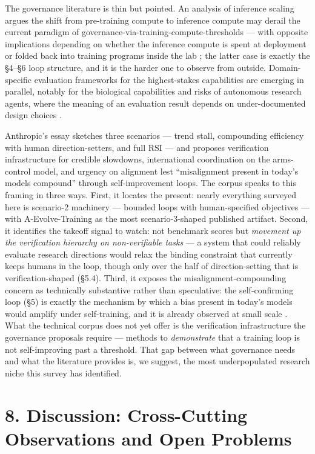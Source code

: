 \documentclass[
  11pt,
]{article}
\begin{document}
The governance literature is thin but pointed. An analysis of inference
scaling argues the shift from pre-training compute to inference compute
may derail the current paradigm of
governance-via-training-compute-thresholds --- with opposite
implications depending on whether the inference compute is spent at
deployment or folded back into training programs inside the lab
\citep{ord2025inference}; the latter case is exactly the §4--§6 loop
structure, and it is the harder one to observe from outside.
Domain-specific evaluation frameworks for the highest-stakes
capabilities are emerging in parallel, notably for the biological
capabilities and risks of autonomous research agents, where the meaning
of an evaluation result depends on under-documented design choices
\citep{paskov2026measuring}.

Anthropic's essay \citep{anthropic2026rsi} sketches three scenarios ---
trend stall, compounding efficiency with human direction-setters, and
full RSI --- and proposes verification infrastructure for credible
slowdowns, international coordination on the arms-control model, and
urgency on alignment lest ``misalignment present in today's models
compound'' through self-improvement loops. The corpus speaks to this
framing in three ways. First, it locates the present: nearly everything
surveyed here is scenario-2 machinery --- bounded loops with
human-specified objectives --- with A-Evolve-Training
\citep{shi2026evolve} as the most scenario-3-shaped published artifact.
Second, it identifies the takeoff signal to watch: not benchmark scores
but \emph{movement up the verification hierarchy on non-verifiable
tasks} --- a system that could reliably evaluate research directions
would relax the binding constraint that currently keeps humans in the
loop, though only over the half of direction-setting that is
verification-shaped (§5.4). Third, it exposes the
misalignment-compounding concern as technically substantive rather than
speculative: the self-confirming loop (§5) is exactly the mechanism by
which a bias present in today's models would amplify under
self-training, and it is already observed at small scale
\citep{tan2025breaking}. What the technical corpus does not yet offer is
the verification infrastructure the governance proposals require ---
methods to \emph{demonstrate} that a training loop is not self-improving
past a threshold. That gap between what governance needs and what the
literature provides is, we suggest, the most underpopulated research
niche this survey has identified.

\section{8. Discussion: Cross-Cutting Observations and Open
Problems}\label{discussion-cross-cutting-observations-and-open-problems}
\end{document}

